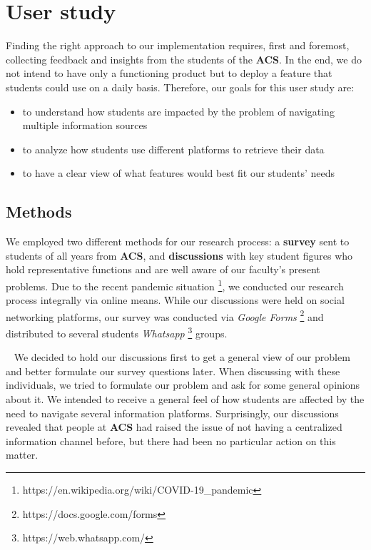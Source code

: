 \chapter{User study} \label{chapter3}

Finding the right approach to our implementation requires, first and foremost, collecting feedback and insights from the students of the \textbf{ACS}. In the end, we do not intend to have only a functioning product but to deploy a feature that students could use on a daily basis. Therefore, our goals for this user study are:

\begin{itemize}
    \setlength{\topsep}{0.5pt}
    \setlength{\itemsep}{0.5pt}
    \setlength{\parsep}{0.5pt}
    \item to understand how students are impacted by the problem of navigating multiple information sources
    \item to analyze how students use different platforms to retrieve their data
    \item to have a clear view of what features would best fit our students' needs
\end{itemize}

\section{Methods} \label{3:methods}

We employed two different methods for our research process: a \textbf{survey} sent to students of all years from \textbf{ACS}, and \textbf{discussions} with key student figures who hold representative functions and are well aware of our faculty's present problems. Due to the recent pandemic situation \footnote{https://en.wikipedia.org/wiki/COVID-19\_pandemic}, we conducted our research process integrally via online means. While our discussions were held on social networking platforms, our survey was conducted via \textit{Google Forms} \footnote{https://docs.google.com/forms} and distributed to several students \textit{Whatsapp} \footnote{https://web.whatsapp.com/} groups.

~
We decided to hold our discussions first to get a general view of our problem and better formulate our survey questions later. When discussing with these individuals, we tried to formulate our problem and ask for some general opinions about it. We intended to receive a general feel of how students are affected by the need to navigate several information platforms. Surprisingly, our discussions revealed that people at \textbf{ACS} had raised the issue of not having a centralized information channel before, but there had been no particular action on this matter.

